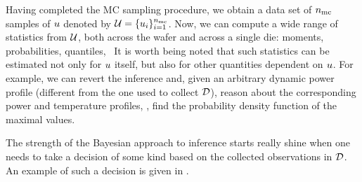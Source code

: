 Having completed the MC sampling procedure, we obtain a data set of ${n_\text{mc}}$ samples of $u$ denoted by $\mathcal{U} = \{ u_i \}_{i = 1}^{n_\text{mc}}$. Now, we can compute a wide range of statistics from $\mathcal{U}$, both across the wafer and across a single die: moments, probabilities, quantiles, \etc\ It is worth being noted that such statistics can be estimated not only for $u$ itself, but also for other quantities dependent on $u$. For example, we can revert the inference and, given an arbitrary dynamic power profile (different from the one used to collect $\mathcal{D}$), reason about the corresponding power and temperature profiles, \eg, find the probability density function of the maximal values.

The strength of the Bayesian approach to inference starts really shine when one needs to take a decision of some kind based on the collected observations in $\mathcal{D}$. An example of such a decision is given in .
